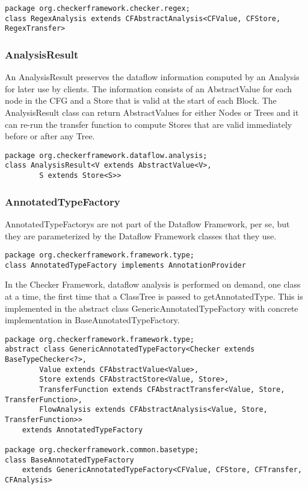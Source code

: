 \begin{verbatim}
package org.checkerframework.checker.regex;
class RegexAnalysis extends CFAbstractAnalysis<CFValue, CFStore, RegexTransfer>
\end{verbatim}


\subsubsection{AnalysisResult}
\label{sec:analysis_result_class}

An AnalysisResult preserves the dataflow information computed by an
Analysis for later use by clients.  The information consists of an
AbstractValue for each node in the CFG and a Store that is valid at
the start of each Block.  The AnalysisResult class can return
AbstractValues for either Nodes or Trees and it can re-run the
transfer function to compute Stores that are valid immediately before
or after any Tree.

\begin{verbatim}
package org.checkerframework.dataflow.analysis;
class AnalysisResult<V extends AbstractValue<V>,
        S extends Store<S>>
\end{verbatim}


\subsubsection{AnnotatedTypeFactory}
\label{sec:annotated_type_factory_classes}

AnnotatedTypeFactorys are not part of the Dataflow Framework, per se,
but they are parameterized by the Dataflow Framework classes that they
use.

\begin{verbatim}
package org.checkerframework.framework.type;
class AnnotatedTypeFactory implements AnnotationProvider
\end{verbatim}

In the Checker Framework, dataflow analysis is performed on demand,
one class at a time, the first time that a ClassTree is passed to
getAnnotatedType.  This is implemented in the abstract class
GenericAnnotatedTypeFactory with concrete implementation in
BaseAnnotatedTypeFactory.

\begin{verbatim}
package org.checkerframework.framework.type;
abstract class GenericAnnotatedTypeFactory<Checker extends BaseTypeChecker<?>,
        Value extends CFAbstractValue<Value>,
        Store extends CFAbstractStore<Value, Store>,
        TransferFunction extends CFAbstractTransfer<Value, Store, TransferFunction>,
        FlowAnalysis extends CFAbstractAnalysis<Value, Store, TransferFunction>>
    extends AnnotatedTypeFactory

package org.checkerframework.common.basetype;
class BaseAnnotatedTypeFactory
    extends GenericAnnotatedTypeFactory<CFValue, CFStore, CFTransfer, CFAnalysis>
\end{verbatim}


